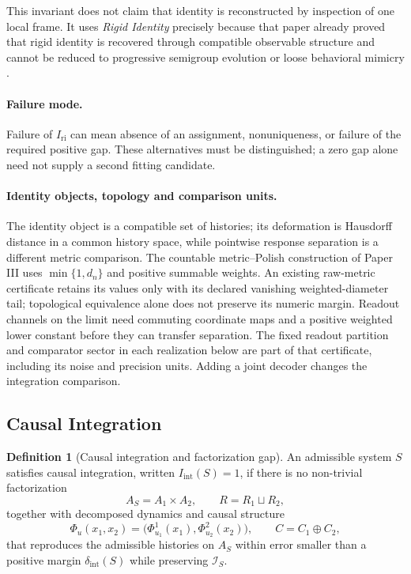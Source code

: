 \documentclass[11pt,a4paper]{article}
\theoremstyle{definition}
\newtheorem{definition}[theorem]{Definition}
\newcommand{\Iri}{I_{\mathrm{ri}}}
\newcommand{\Iint}{I_{\mathrm{int}}}
\newcommand{\Aset}{A_S}
\newcommand{\Id}{\mathcal{I}}
\begin{document}
This invariant does not claim that identity is reconstructed by inspection of one local frame. It uses \textit{Rigid Identity} precisely because that paper already proved that rigid identity is recovered through compatible observable structure and cannot be reduced to progressive semigroup evolution or loose behavioral mimicry \cite{paper1}.

\paragraph{Failure mode.}
Failure of $\Iri$ can mean absence of an assignment, nonuniqueness, or failure of the required positive gap. These alternatives must be distinguished; a zero gap alone need not supply a second fitting candidate.

\paragraph{Identity objects, topology and comparison units.}
The identity object is a compatible set of histories; its deformation is
Hausdorff distance in a common history space, while pointwise response
separation is a different metric comparison. The countable metric--Polish
construction of Paper III uses $\min\{1,d_n\}$ and positive summable weights.
An existing raw-metric certificate retains its values only with its declared
vanishing weighted-diameter tail; topological equivalence alone does not
preserve its numeric margin. Readout channels on the limit need commuting
coordinate maps and a positive weighted lower constant before they can
transfer separation. The fixed readout partition and comparator sector in
each realization below are part of that certificate, including its noise and
precision units. Adding a joint decoder changes the integration comparison.

\subsection{Causal Integration}
\begin{definition}[Causal integration and factorization gap]\label{def:iint}
An admissible system $S$ satisfies causal integration, written $\Iint(S)=1$, if there is no non-trivial factorization
\[
\Aset = A_1 \times A_2,\qquad
R = R_1 \sqcup R_2,
\]
together with decomposed dynamics and causal structure
\[
\Phi_u(x_1,x_2)=\bigl(\Phi^1_{u_1}(x_1),\Phi^2_{u_2}(x_2)\bigr),
\qquad
C = C_1 \oplus C_2,
\]
that reproduces the admissible histories on $\Aset$ within error smaller than a positive margin $\delta_{\mathrm{int}}(S)$ while preserving $\Id_S$.
\end{definition}
\end{document}
